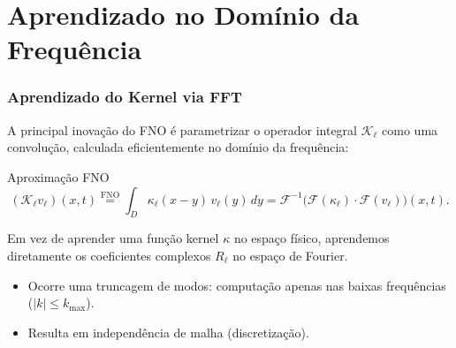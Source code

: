 \documentclass[usenames,dvipsnames,brazil,aspectratio=169]{beamer}
\begin{document}
\section{Aprendizado no Domínio da Frequência}

\begin{frame}[t]
    \frametitle{Aprendizado do Kernel via FFT}
    A principal inovação do FNO é parametrizar o operador integral $\mathcal{K}_\ell$ como uma convolução, calculada eficientemente no domínio da frequência:
    
    \begin{block}{Aproximação FNO}
        $$ (\mathcal{K}_\ell v_\ell)(x,t) \overset{\text{FNO}}{=} \int_{D} \kappa_\ell(x - y)\, v_\ell(y)\,dy = \mathcal{F}^{-1} \Big( \mathcal{F}(\kappa_\ell) \cdot \mathcal{F}(v_\ell) \Big)(x,t).
        $$
    \end{block}

    Em vez de aprender uma função kernel $\kappa$ no espaço físico, aprendemos diretamente os coeficientes complexos $R_{\ell}$ no espaço de Fourier.
    \vspace{0.3cm}

    \begin{itemize}
        \item Ocorre uma truncagem de modos: computação apenas nas baixas frequências ($|k| \le k_{\max}$).
        \item Resulta em independência de malha (discretização).
    \end{itemize}
\end{frame}
\end{document}
